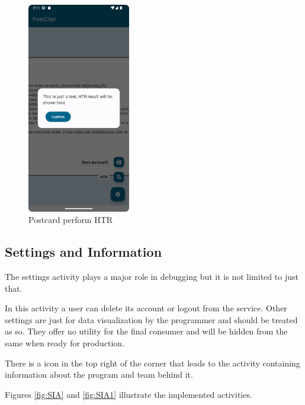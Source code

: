 \begin{figure}[!ht]
	\centering
	\includegraphics[trim={0cm -3cm 0 -3cm}, width=0.4\textwidth]{./Chapter6/Figures/PostcardActivityHTR}
	\caption{Postcard perform HTR}
	\label{fig:VA2}
\end{figure}


\subsection{Settings and Information}
The settings activity plays a major role in debugging but it is not limited to just that.

In this activity a user can delete its account or logout from the service.
Other settings are just for data visualization by the programmer and should be treated as so. They offer no utility for the final consumer and will be hidden from the same when ready for production.

There is a icon in the top right of the corner that leads to the activity containing information about the program and team behind it.

Figures \ref{fig:SIA} and \ref{fig:SIA1} illustrate the implemented activities.

